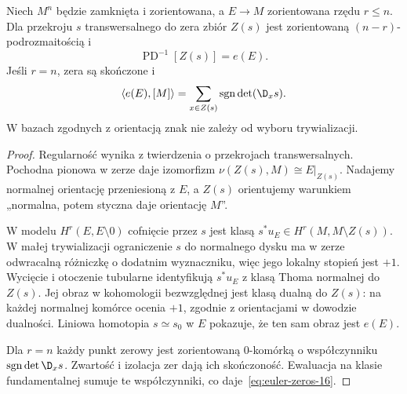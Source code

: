 \begin{twierdzenie}
\label{thm:euler-zeros-16}
Niech $M^n$ będzie
zamknięta i zorientowana,
a $E\to M$ zorientowana
rzędu $r\leq n$.
Dla przekroju $s$
transwersalnego do zera
zbiór $Z(s)$ jest
zorientowaną
$(n-r)$-podrozmaitością i
\[
 \operatorname{PD}^{-1}[Z(s)]=e(E).
\]
Jeśli $r=n$, zera są
skończone i
\begin{equation}\label{eq:euler-zeros-16}
 \langle e(E),[M]\rangle
   =\sum_{x\in Z(s)}
       \operatorname{sgn}\det(\D_xs).
\end{equation}
W bazach zgodnych z
orientacją znak nie
zależy od wyboru
trywializacji.
\end{twierdzenie}
\begin{proof}
Regularność wynika z twierdzenia o przekrojach transwersalnych.
Pochodna pionowa w zerze daje izomorfizm
$\nu(Z(s),M)\cong E|_{Z(s)}$. Nadajemy normalnej
orientację przeniesioną z $E$, a $Z(s)$ orientujemy
warunkiem „normalna, potem styczna daje orientację $M$”.

W modelu $H^r(E,E\setminus0)$ cofnięcie przez $s$
jest klasą $s^*u_E\in H^r(M,M\setminus Z(s))$.
W małej trywializacji ograniczenie $s$ do normalnego
dysku ma w zerze odwracalną różniczkę o dodatnim
wyznaczniku, więc jego lokalny stopień jest $+1$.
Wycięcie i otoczenie tubularne identyfikują
$s^*u_E$ z klasą Thoma normalnej do $Z(s)$.
Jej obraz w kohomologii bezwzględnej jest klasą
dualną do $Z(s)$: na każdej normalnej komórce
ocenia $+1$, zgodnie z orientacjami w dowodzie dualności.
Liniowa homotopia $s\simeq s_0$ w $E$ pokazuje,
że ten sam obraz jest $e(E)$.

Dla $r=n$ każdy punkt zerowy jest zorientowaną
$0$-komórką o współczynniku
$\operatorname{sgn}\det\D_xs$. Zwartość i izolacja
zer dają ich skończoność. Ewaluacja na klasie
fundamentalnej sumuje te współczynniki,
co daje~\eqref{eq:euler-zeros-16}.
\end{proof}


